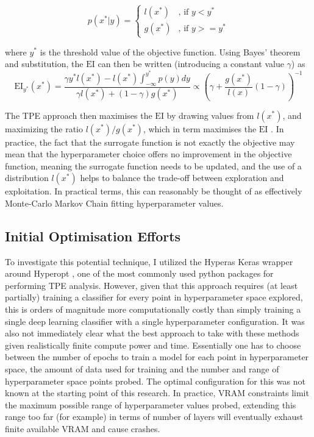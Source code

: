 \begin{equation}
    p(x^*|y) = \begin{cases} \textit{l}(x^*) & \mbox{, if }  y <y^* \\ \textit{g}(x^*) & \mbox{, if } y>=y^* \end{cases}
\end{equation}

where $y^*$ is the threshold value of the objective function. Using Bayes' theorem and substitution, the $\textrm{EI}$ can then be written (introducing a constant value $\gamma$) as 
\begin{equation}
    \textrm{EI}_{y^*}(x^*)=\frac{\gamma y^* \textit{l}(x^*)-\textit{l}(x^*)\int_{-\infty}^{y^*}p(y)dy}{\gamma \textit{l}(x^*)+(1-\gamma) \textit{g}(x^*)} \propto \left( \gamma +\frac{\textit{g}(x^*)}{\textit{l}(x)} (1-\gamma)\right)^{-1}
\end{equation}


The TPE approach then maximises the $\textrm{EI}$ by drawing values from $\textit{l}(x^*)$, and maximizing the ratio $\textit{l}(x^*)/\textit{g}(x^*)$, which in term maximises the $\textrm{EI}$ \cite{tdshyper}. In practice, the fact that the surrogate function is not exactly the objective may mean that the hyperparameter choice offers no improvement in the objective function, meaning the surrogate function needs to be updated, and the use of a distribution $\textit{l}(x^*)$ helps to balance the trade-off between exploration and exploitation. In practical terms, this can reasonably be thought of as effectively Monte-Carlo Markov Chain fitting hyperparameter values.

\subsection{Initial Optimisation Efforts}

To investigate this potential technique, I utilized the Hyperas \cite{hyperas} Keras wrapper around Hyperopt \cite{hyperopt}, one of the most commonly used python packages for performing TPE analysis. However, given that this approach requires (at least partially) training a classifier for every point in hyperparameter space explored, this is orders of magnitude more computationally costly than simply training a single deep learning classifier with a single hyperparameter configuration. It was also not immediately clear what the best approach to take with these methods given realistically finite compute power and time. Essentially one has to choose between the number of epochs to train a model for each point in hyperparameter space, the amount of data used for training and the number and range of hyperparameter space points probed. The optimal configuration for this was not known at the starting point of this research. In practice, VRAM constraints limit the maximum possible range of hyperparameter values probed, extending this range too far (for example) in terms of number of layers will eventually exhaust finite available VRAM and cause crashes.

